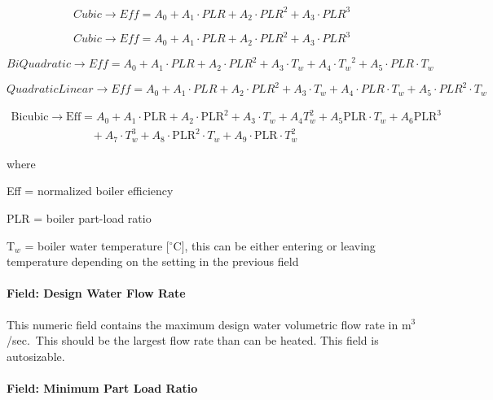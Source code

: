 \begin{equation}
    Cubic \to Eff = {A_0} + {A_1}\cdot PLR + {A_2}\cdot PL{R^2} + {A_3}\cdot PL{R^3}
\end{equation}

\begin{equation}
    Cubic \to Eff = {A_0} + {A_1}\cdot PLR + {A_2}\cdot PL{R^2} + {A_3}\cdot PL{R^3}
\end{equation}

\begin{equation}
    BiQuadratic \to Eff = {A_0} + {A_1}\cdot PLR + {A_2}\cdot PL{R^2} + {A_3}\cdot {T_w} + {A_4}\cdot {T_w}^2 + {A_5}\cdot PLR\cdot {T_w}
\end{equation}

\begin{equation}
    QuadraticLinear \to Eff = {A_0} + {A_1}\cdot PLR + {A_2}\cdot PL{R^2} + {A_3}\cdot {T_w} + {A_4}\cdot PLR\cdot {T_w} + {A_5}\cdot PL{R^2}\cdot {T_w}
\end{equation}

\begin{equation}
    \begin{array}{l}
        \mathrm{Bicubic} \to \mathrm{Eff} = A_0 + A_1 \cdot \mathrm{PLR} + A_2 \cdot \mathrm{PLR}^2 + A_3 \cdot T_w + A_4 T_w^2 + A_5 \mathrm{PLR} \cdot T_w + A_6 \mathrm{PLR}^3 \\
        \quad \quad \quad \quad \quad \quad \quad  + A_7 \cdot T_w^3 + A_8 \cdot \mathrm{PLR}^2 \cdot T_w + A_9 \cdot \mathrm{PLR} \cdot T_w^2
    \end{array}
\end{equation}

where

Eff = normalized boiler efficiency

PLR = boiler part-load ratio

T\(_{w}\) = boiler water temperature {[}$^\circ$C{]}, this can be either entering or leaving temperature depending on the setting in the previous field

\paragraph{Field: Design Water Flow Rate}\label{field-design-water-flow-rate-001}

This numeric field contains the maximum design water volumetric flow rate in m\(^{3}\)/sec.~This should be the largest flow rate than can be heated. This field is autosizable.

\paragraph{Field: Minimum Part Load Ratio}\label{field-minimum-part-load-ratio-9}

